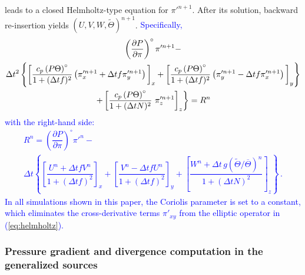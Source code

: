 \documentclass{ametsoc}
\theoremstyle{definition}
\newcommand{\klein}[1]{\textcolor{blue}{#1}}
\newcommand{\eq}[1]{(\ref{#1})}
\newcommand{\dt}{\Delta t}
\newcommand{\Thetabar}{\overline{\Theta}}
\newcommand{\Thetatilde}{{\widetilde \Theta}}
\begin{document}
leads to a closed Helmholtz-type equation for ${\pi'}^{n+1}$. After its 
solution, backward re-insertion yields $(U, V, W, \Thetatilde)^{n+1}$. 
\klein{Specifically, 
%
 \begin{multline}\label{eq:helmholtz}
 \left(\dfrac{\partial P}{\partial\pi}\right)^{\circ}\pi'^{n+1} - \\
\dt^2 
\left\{ 
      \left[
        \dfrac{c_p \left(P\Theta\right)^{\circ}}{1+(\dt f)^2} 
          \left(\pi'^{n+1}_x+\dt f\pi'^{n+1}_y
          \right)
        \rule{0pt}{12pt}\right]_x
       +\left[
          \dfrac{c_p \left(P\Theta\right)^{\circ}}{1+(\dt f)^2} 
            \left(\pi'^{n+1}_y-\dt f\pi'^{n+1}_x
            \right)
         \rule{0pt}{12pt}\right]_y
      \right\}
    \\
    \left.
  + \left[\dfrac{c_p \left(P\Theta\right)^{\circ}}{1+(\dt N)^2} \ \pi'^{n+1}_z
      \rule{0pt}{12pt}\right]_z
    \right\}
  = R^n
 \end{multline}
%
with the right-hand side:
%
\begin{multline}\label{eq:helmholtz_rhs}
R^n=\left(\dfrac{\partial P}{\partial\pi}\right)^{\circ}\pi'^n-\\
\dt
\left\{
\left[\dfrac{U^n +\dt f V^n}{1+(\dt f)^2}\right]_x  
+ \left[\dfrac{V^n - \dt f U^n}{1+(\dt f)^2}\right]_y
+\left[\dfrac{W^n+\dt\, g\left(\Thetatilde/\Thetabar\right)^n}{1+(\dt N)^2}\right]_z\right\} \,.
\end{multline}
%
In all simulations shown in this paper, the Coriolis parameter is set to a
constant, which eliminates the cross-derivative terms $\pi'_{xy}$ from
the elliptic operator in \eq{eq:helmholtz}.}


\subsubsection{Pressure gradient and divergence computation in the generalized sources}
\label{sssec:NodalDiscretization}
\end{document}
